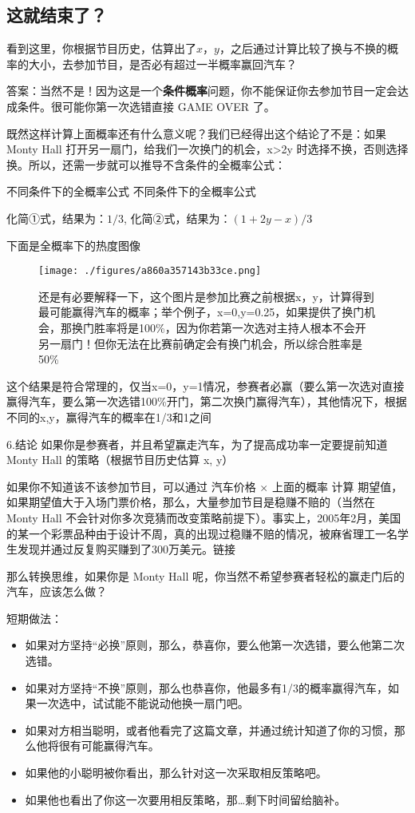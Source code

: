 \subsection{这就结束了？}
看到这里，你根据节目历史，估算出了$x$，$y$，之后通过计算比较了换与不换的概率的大小，去参加节目，是否必有超过一半概率赢回汽车？

答案：当然不是！因为这是一个\textbf{条件概率}问题，你不能保证你去参加节目一定会达成条件。很可能你第一次选错直接 GAME OVER 了。

既然这样计算上面概率还有什么意义呢？我们已经得出这个结论了不是：如果 Monty Hall 打开另一扇门，给我们一次换门的机会，x>2y 时选择不换，否则选择换。所以，还需一步就可以推导不含条件的全概率公式：

不同条件下的全概率公式
不同条件下的全概率公式

化简①式，结果为：$1/3$,
化简②式，结果为：$(1+2y-x)/3$

下面是全概率下的热度图像

\begin{figure}[ht]
\centering
\texttt{[image: ./figures/a860a357143b33ce.png]}
\caption{还是有必要解释一下，这个图片是参加比赛之前根据x，y，计算得到最可能赢得汽车的概率；举个例子，x=0,y=0.25，如果提供了换门机会，那换门胜率将是100\%，因为你若第一次选对主持人根本不会开另一扇门！但你无法在比赛前确定会有换门机会，所以综合胜率是50\%} \label{fig_MontyH2}
\end{figure}

这个结果是符合常理的，仅当x=0，y=1情况，参赛者必赢（要么第一次选对直接赢得汽车，要么第一次选错100\%开门，第二次换门赢得汽车），其他情况下，根据不同的x,y，赢得汽车的概率在1/3和1之间

6.结论
如果你是参赛者，并且希望赢走汽车，为了提高成功率一定要提前知道 Monty Hall 的策略（根据节目历史估算 x, y）

如果你不知道该不该参加节目，可以通过 汽车价格 × 上面的概率 计算 期望值，如果期望值大于入场门票价格，那么，大量参加节目是稳赚不赔的（当然在 Monty Hall 不会针对你多次竞猜而改变策略前提下）。事实上，2005年2月，美国的某一个彩票品种由于设计不周，真的出现过稳赚不赔的情况，被麻省理工一名学生发现并通过反复购买赚到了300万美元。链接

那么转换思维，如果你是 Monty Hall 呢，你当然不希望参赛者轻松的赢走门后的汽车，应该怎么做？

短期做法：

\begin{itemize}
\item 如果对方坚持“必换”原则，那么，恭喜你，要么他第一次选错，要么他第二次选错。
\item 如果对方坚持“不换”原则，那么也恭喜你，他最多有1/3的概率赢得汽车，如果一次选中，试试能不能说动他换一扇门吧。
\item 如果对方相当聪明，或者他看完了这篇文章，并通过统计知道了你的习惯，那么他将很有可能赢得汽车。
\item 如果他的小聪明被你看出，那么针对这一次采取相反策略吧。
\item 如果他也看出了你这一次要用相反策略，那…剩下时间留给脑补。
\end{itemize}

